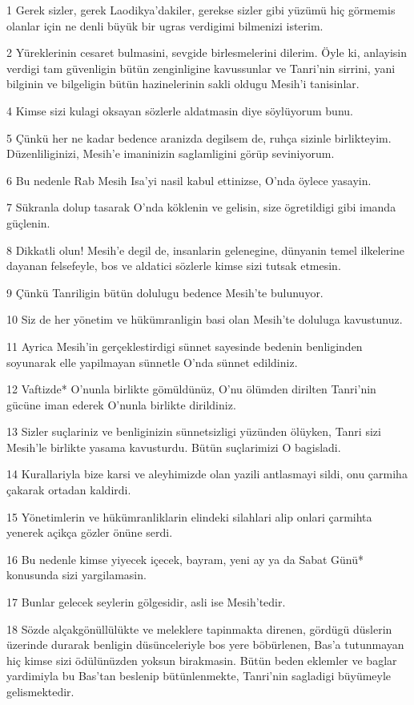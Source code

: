 \par 1 Gerek sizler, gerek Laodikya'dakiler, gerekse sizler gibi yüzümü hiç görmemis olanlar için ne denli büyük bir ugras verdigimi bilmenizi isterim.
\par 2 Yüreklerinin cesaret bulmasini, sevgide birlesmelerini dilerim. Öyle ki, anlayisin verdigi tam güvenligin bütün zenginligine kavussunlar ve Tanri'nin sirrini, yani bilginin ve bilgeligin bütün hazinelerinin sakli oldugu Mesih'i tanisinlar.
\par 4 Kimse sizi kulagi oksayan sözlerle aldatmasin diye söylüyorum bunu.
\par 5 Çünkü her ne kadar bedence aranizda degilsem de, ruhça sizinle birlikteyim. Düzenliliginizi, Mesih'e imaninizin saglamligini görüp seviniyorum.
\par 6 Bu nedenle Rab Mesih Isa'yi nasil kabul ettinizse, O'nda öylece yasayin.
\par 7 Sükranla dolup tasarak O'nda köklenin ve gelisin, size ögretildigi gibi imanda güçlenin.
\par 8 Dikkatli olun! Mesih'e degil de, insanlarin gelenegine, dünyanin temel ilkelerine dayanan felsefeyle, bos ve aldatici sözlerle kimse sizi tutsak etmesin.
\par 9 Çünkü Tanriligin bütün dolulugu bedence Mesih'te bulunuyor.
\par 10 Siz de her yönetim ve hükümranligin basi olan Mesih'te doluluga kavustunuz.
\par 11 Ayrica Mesih'in gerçeklestirdigi sünnet sayesinde bedenin benliginden soyunarak elle yapilmayan sünnetle O'nda sünnet edildiniz.
\par 12 Vaftizde* O'nunla birlikte gömüldünüz, O'nu ölümden dirilten Tanri'nin gücüne iman ederek O'nunla birlikte dirildiniz.
\par 13 Sizler suçlariniz ve benliginizin sünnetsizligi yüzünden ölüyken, Tanri sizi Mesih'le birlikte yasama kavusturdu. Bütün suçlarimizi O bagisladi.
\par 14 Kurallariyla bize karsi ve aleyhimizde olan yazili antlasmayi sildi, onu çarmiha çakarak ortadan kaldirdi.
\par 15 Yönetimlerin ve hükümranliklarin elindeki silahlari alip onlari çarmihta yenerek açikça gözler önüne serdi.
\par 16 Bu nedenle kimse yiyecek içecek, bayram, yeni ay ya da Sabat Günü* konusunda sizi yargilamasin.
\par 17 Bunlar gelecek seylerin gölgesidir, asli ise Mesih'tedir.
\par 18 Sözde alçakgönüllülükte ve meleklere tapinmakta direnen, gördügü düslerin üzerinde durarak benligin düsünceleriyle bos yere böbürlenen, Bas'a tutunmayan hiç kimse sizi ödülünüzden yoksun birakmasin. Bütün beden eklemler ve baglar yardimiyla bu Bas'tan beslenip bütünlenmekte, Tanri'nin sagladigi büyümeyle gelismektedir.

